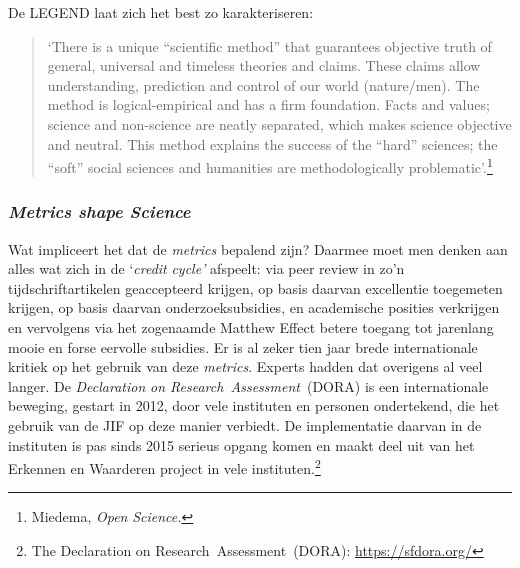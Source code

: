 \documentclass[smallauthor, chapterhaspagenum, nochapterinheader, pagenuminheader,  bigchapnum,medium2, tocpages, garamond, titleinheader]{jote-book}
\begin{document}
	De LEGEND laat zich het best zo karakteriseren:

	\begin{quote}
		\itshape

		‘There is a unique “scientific method” that guarantees objective truth of general, universal and timeless theories and claims. These claims allow understanding, prediction and control of our world (nature/men). The method is logical-empirical and has a firm foundation. Facts and values; science and non-science are neatly separated, which makes science objective and neutral. This method explains the success of the “hard” sciences; the “soft” social sciences and humanities are methodologically problematic'.\footnote{Miedema, \emph{Open }\emph{Science}\emph{.}}
	\end{quote}

	\subsubsection{\emph{Metrics shape Science}}



	Wat impliceert het dat de \emph{metrics} bepalend zijn? Daarmee moet men denken aan alles wat zich in de ‘\emph{credit }\emph{cycle}\emph{'} afspeelt: via peer review in zo'n tijdschriftartikelen geaccepteerd krijgen, op basis daarvan excellentie toegemeten krijgen, op basis daarvan onderzoeksubsidies, en academische posities verkrijgen en vervolgens via het zogenaamde Matthew Effect betere toegang tot jarenlang mooie en forse eervolle subsidies. Er is al zeker tien jaar brede internationale kritiek op het gebruik van deze \emph{metrics}. Experts hadden dat overigens al veel langer. De\emph{ }\emph{Declaration}\emph{ on Research Assessment} (DORA) is een internationale beweging, gestart in 2012, door vele instituten en personen ondertekend, die het gebruik van de JIF op deze manier verbiedt. De implementatie daarvan in de instituten is pas sinds 2015 serieus opgang komen en maakt deel uit van het Erkennen en Waarderen project in vele instituten.\footnote{The Declaration on Research Assessment (DORA): \href{https://sfdora.org/}{https://sfdora.org/} }
\end{document}
